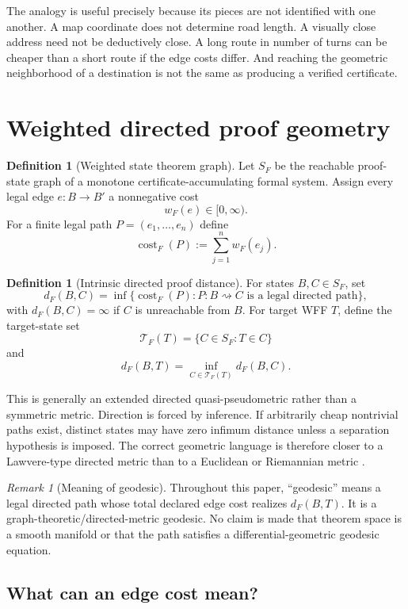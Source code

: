 \documentclass[11pt]{article}
\theoremstyle{definition}
\newtheorem{definition}[theorem]{Definition}
\theoremstyle{remark}
\newtheorem{remark}[theorem]{Remark}
\newcommand{\cost}{\operatorname{cost}}
\begin{document}
The analogy is useful precisely because its pieces are not identified with one another. A map coordinate does not determine road length. A visually close address need not be deductively close. A long route in number of turns can be cheaper than a short route if the edge costs differ. And reaching the geometric neighborhood of a destination is not the same as producing a verified certificate.

\section{Weighted directed proof geometry}

\begin{definition}[Weighted state theorem graph]
Let $S_F$ be the reachable proof-state graph of a monotone certificate-accumulating formal system. Assign every legal edge $e:B\to B'$ a nonnegative cost
\[
w_F(e)\in[0,\infty).
\]
For a finite legal path $P=(e_1,\dots,e_n)$ define
\[
\cost_F(P):=\sum_{j=1}^n w_F(e_j).
\]
\end{definition}

\begin{definition}[Intrinsic directed proof distance]
For states $B,C\in S_F$, set
\[
d_F(B,C)=\inf\{\cost_F(P): P:B\rightsquigarrow C\text{ is a legal directed path}\},
\]
with $d_F(B,C)=\infty$ if $C$ is unreachable from $B$. For target WFF $T$, define the target-state set
\[
\mathcal T_F(T)=\{C\in S_F:T\in C\}
\]
and
\[
d_F(B,T)=\inf_{C\in\mathcal T_F(T)}d_F(B,C).
\]
\end{definition}

This is generally an extended directed quasi-pseudometric rather than a symmetric metric. Direction is forced by inference. If arbitrarily cheap nontrivial paths exist, distinct states may have zero infimum distance unless a separation hypothesis is imposed. The correct geometric language is therefore closer to a Lawvere-type directed metric than to a Euclidean or Riemannian metric \cite{UTGI}.

\begin{remark}[Meaning of geodesic]
Throughout this paper, ``geodesic'' means a legal directed path whose total declared edge cost realizes $d_F(B,T)$. It is a graph-theoretic/directed-metric geodesic. No claim is made that theorem space is a smooth manifold or that the path satisfies a differential-geometric geodesic equation.
\end{remark}

\subsection{What can an edge cost mean?}
\end{document}
